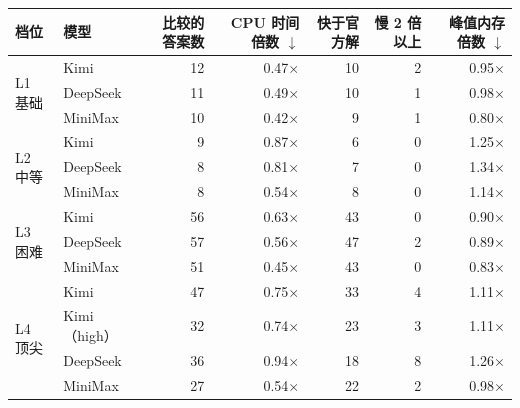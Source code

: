 \begin{tabular}{@{}llrrrrr@{}}
\toprule
档位 & 模型 & 比较的答案数 & CPU 时间倍数 $\downarrow$ & 快于官方解 & 慢 2 倍以上 & 峰值内存倍数 $\downarrow$ \\
\midrule
\multirow{3}{*}{L1 基础} & Kimi & 12 & 0.47$\times$ & 10 & 2 & 0.95$\times$ \\
 & DeepSeek & 11 & 0.49$\times$ & 10 & 1 & 0.98$\times$ \\
 & MiniMax & 10 & 0.42$\times$ & 9 & 1 & 0.80$\times$ \\
\cmidrule(lr){1-7}
\multirow{3}{*}{L2 中等} & Kimi & 9 & 0.87$\times$ & 6 & 0 & 1.25$\times$ \\
 & DeepSeek & 8 & 0.81$\times$ & 7 & 0 & 1.34$\times$ \\
 & MiniMax & 8 & 0.54$\times$ & 8 & 0 & 1.14$\times$ \\
\cmidrule(lr){1-7}
\multirow{3}{*}{L3 困难} & Kimi & 56 & 0.63$\times$ & 43 & 0 & 0.90$\times$ \\
 & DeepSeek & 57 & 0.56$\times$ & 47 & 2 & 0.89$\times$ \\
 & MiniMax & 51 & 0.45$\times$ & 43 & 0 & 0.83$\times$ \\
\cmidrule(lr){1-7}
\multirow{4}{*}{L4 顶尖} & Kimi & 47 & 0.75$\times$ & 33 & 4 & 1.11$\times$ \\
 & Kimi（high） & 32 & 0.74$\times$ & 23 & 3 & 1.11$\times$ \\
 & DeepSeek & 36 & 0.94$\times$ & 18 & 8 & 1.26$\times$ \\
 & MiniMax & 27 & 0.54$\times$ & 22 & 2 & 0.98$\times$ \\
\bottomrule
\end{tabular}
